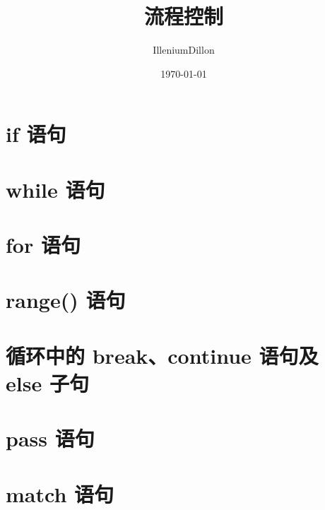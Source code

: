 \documentclass[a4paper, 12pt]{article}
\begin{document}
    \title{流程控制}
    \author{IlleniumDillon}
    \date{\today}
    \maketitle

    \section{if 语句}
    \section{while 语句}
    \section{for 语句}
    \section{range() 语句}
    \section{循环中的 break、continue 语句及 else 子句}
    \section{pass 语句}
    \section{match 语句}
    
\end{document}
